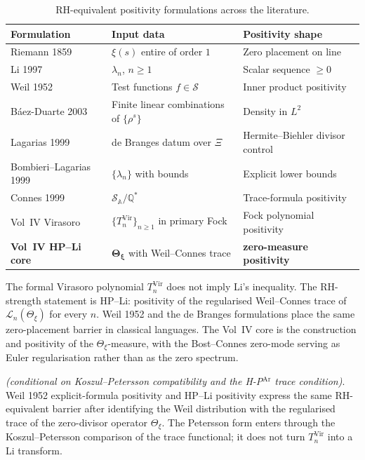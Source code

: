 \begin{table}[h]
\centering
\small
\begin{tabular}{l|l|l}
Formulation & Input data & Positivity shape \\
\hline
Riemann 1859 & \(\xi(s)\) entire of order \(1\) & Zero placement on line\\
Li 1997 & \(\lambda_{n}\), \(n\geq 1\) & Scalar sequence \(\geq 0\)\\
Weil 1952 & Test functions \(f\in\mathcal{S}\) & Inner product positivity\\
B\'aez-Duarte 2003 & Finite linear combinations of \(\{\rho^{s}\}\) & Density in \(L^{2}\)\\
Lagarias 1999 & de Branges datum over \(\Xi\) & Hermite--Biehler divisor control\\
Bombieri--Lagarias 1999 & \(\{\lambda_{n}\}\) with bounds & Explicit lower bounds\\
Connes 1999 & \(\mathcal{S}_{\mathbb{A}}/\mathbb{Q}^{*}\) & Trace-formula positivity\\
Vol~IV Virasoro & \(\{T_{n}^{\mathrm{Vir}}\}_{n\geq 1}\) in primary Fock & Fock polynomial positivity\\
\textbf{Vol~IV HP--Li core} & \(\boldsymbol{\Theta_{\xi}}\) with Weil--Connes trace & \textbf{zero-measure positivity}\\
\end{tabular}
\caption{RH-equivalent positivity formulations across the literature.}
\label{v4-arith:vb:tbl:comparison}
\end{table}

\begin{remark}
\label{v4-arith:vb:rem:placement}
The formal Virasoro polynomial \(T_{n}^{\mathrm{Vir}}\) does not
imply Li's inequality. The RH-strength statement is HP--Li:
positivity of the regularised Weil--Connes trace of
\(\mathcal L_n(\Theta_{\xi})\) for every \(n\). Weil 1952 and the
de Branges formulations place the same zero-placement barrier in
classical languages. The Vol~IV core is the construction and
positivity of the \(\Theta_{\xi}\)-measure, with the Bost--Connes
zero-mode serving as Euler regularisation rather than as the zero
spectrum.
\end{remark}

\begin{proposition}
\label{v4-arith:vb:prop:weil-equivalence}
\emph{(conditional on Koszul--Petersson
compatibility  and the
H-P\(^{\mathrm{Ar}}\) trace condition)}. Weil 1952 explicit-formula
positivity and HP--Li positivity express the same RH-equivalent
barrier after identifying the Weil distribution with the regularised
trace of the zero-divisor operator \(\Theta_{\xi}\). The Petersson form enters
through the Koszul--Petersson comparison of the trace functional; it
does not turn \(T_{n}^{\mathrm{Vir}}\) into a Li transform.
\end{proposition}

